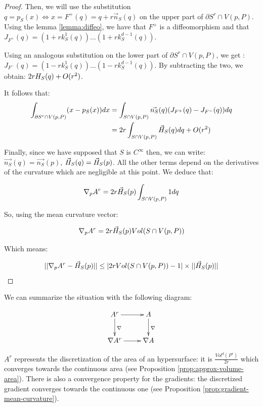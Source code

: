 \begin{proof}
Then, we will use the substitution $ q = p_S(x) \iff x = F^{+}(q) = q +
r \vec{n}_S(q) $ on the upper part of $ \partial{S^r} \cap V(p, P) $. Using
the lemma \ref{lemma:diffeo}, we have that $ F^{+} $ is a diffeomorphism and that
$ J_{F^+}(q) = (1 + r k^1_S(q)) \hdots (1 + r k^{d-1}_S(q)) $.

Using an analogous substitution on the lower part of $ \partial{S^r} \cap V(p,
P) $, we get : $ J_{F^-}(q) = (1 - r k^1_S(q)) \hdots (1 - r k^{d-1}_S(q)) $. By
subtracting the two, we obtain: $ 2 r H_{S}(q) + O(r^2) $.

It follows that:
\begin{align*}
    \int_{\partial{S^r} \cap V(p, P)} (x - p_S(x)) dx &= \int_{S \cap V(p, P)}
    \vec{n_S}(q) ( J_{F^+}(q) -J_{F^-}(q) ) dq \\
    &= 2r \int_{S \cap V(p, P)} \vec{H}_{S}(q) dq + O(r^2) \\
\end{align*}

Finally, since we have supposed that $ S $ is $ C^{\infty} $ then, we can write:
$ \vec{n_S}(q) = \vec{n_S}(p) $, $ \vec{H}_{S}(q) = \vec{H}_{S}(p) $. All the other
terms depend on the derivatives of the curvature which are negligible at this
point. We deduce that:

$$ \nabla_p A^r = 2r \vec{H}_{S}(p) \int_{S \cap V(p, P)} 1 dq $$

So, using the mean curvature vector:

$$ \nabla_p A^r = 2r \vec{H}_{S}(p) Vol(S \cap V(p, P)) $$

Which means:

$$ ||\nabla_p A^r - \vec{H}_{S}(p) || \leq | 2r Vol(S \cap V(p, P)) - 1 |
\times|| \vec{H}_{S}(p) ||$$

\end{proof}

We can summarize the situation with the following diagram:

\begin{displaymath}
    \xymatrix{A^r \ar[d]^{\nabla} \ar[r] & A \ar[d]^{\nabla} \\
        \nabla A^r \ar[r] & \nabla A }
\end{displaymath}

$ A^r $ represents the discretization of the area of an hypersurface: it
is $ \frac{Vol^d(P^r)}{2r} $ which converges towards the continuous area (see
Proposition \ref{prop:approx-volume-area}). There is also a convergence property
for the gradients: the discretized gradient converges towards the continuous one
(see Proposition \ref{prop:gradient-mean-curvature}).

